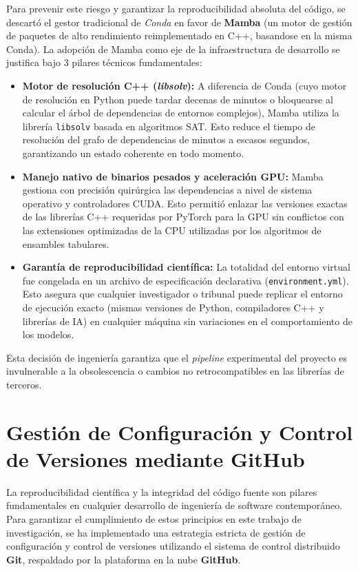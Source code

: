 \documentclass[12pt,a4paper,onecolumn,oneside]{report}
\begin{document}
Para prevenir este riesgo y garantizar la reproducibilidad absoluta del código, se descartó el gestor tradicional de \textit{Conda} en favor de \textbf{Mamba} (un motor de gestión de paquetes de alto rendimiento reimplementado en C++, basandose en la misma Conda). La adopción de Mamba como eje de la infraestructura de desarrollo se justifica bajo 3 pilares técnicos fundamentales:

\begin{itemize}
    \item \textbf{Motor de resolución C++ (\textit{libsolv}):} A diferencia de Conda (cuyo motor de resolución en Python puede tardar decenas de minutos o bloquearse al calcular el árbol de dependencias de entornos complejos), Mamba utiliza la librería \texttt{libsolv} basada en algoritmos SAT. Esto reduce el tiempo de resolución del grafo de dependencias de minutos a escasos segundos, garantizando un estado coherente en todo momento.
    
    \item \textbf{Manejo nativo de binarios pesados y aceleración GPU:} Mamba gestiona con precisión quirúrgica las dependencias a nivel de sistema operativo y controladores CUDA. Esto permitió enlazar las versiones exactas de las librerías C++ requeridas por PyTorch para la GPU sin conflictos con las extensiones optimizadas de la CPU utilizadas por los algoritmos de ensambles tabulares.

    \item \textbf{Garantía de reproducibilidad científica:} La totalidad del entorno virtual fue congelada en un archivo de especificación declarativa (\texttt{environment.yml}). Esto asegura que cualquier investigador o tribunal puede replicar el entorno de ejecución exacto (mismas versiones de Python, compiladores C++ y librerías de IA) en cualquier máquina sin variaciones en el comportamiento de los modelos.
\end{itemize}

Esta decisión de ingeniería garantiza que el \textit{pipeline} experimental del proyecto es invulnerable a la obsolescencia o cambios no retrocompatibles en las librerías de terceros.

\section{Gestión de Configuración y Control de Versiones mediante GitHub}
La reproducibilidad científica y la integridad del código fuente son pilares fundamentales en cualquier desarrollo de ingeniería de software contemporáneo. Para garantizar el cumplimiento de estos principios en este trabajo de investigación, se ha implementado una estrategia estricta de gestión de configuración y control de versiones utilizando el sistema de control distribuido \textbf{Git}, respaldado por la plataforma en la nube \textbf{GitHub}.
\end{document}

